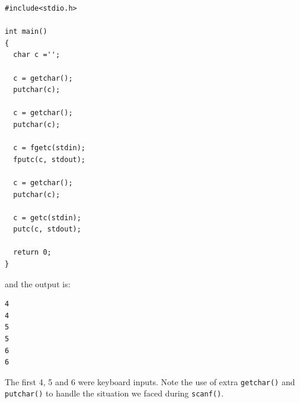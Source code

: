 \begin{verbatim}
#include<stdio.h>

int main()
{
  char c ='';

  c = getchar();
  putchar(c);

  c = getchar();
  putchar(c);

  c = fgetc(stdin);
  fputc(c, stdout);

  c = getchar();
  putchar(c);

  c = getc(stdin);
  putc(c, stdout);

  return 0;
}
\end{verbatim}

and the output is:

\begin{verbatim}
4
4
5
5
6
6
\end{verbatim}

The first 4, 5 and 6 were keyboard inputs. Note the use of extra
\texttt{getchar()} and \texttt{putchar()} to handle the situation we faced
during \texttt{scanf()}.


